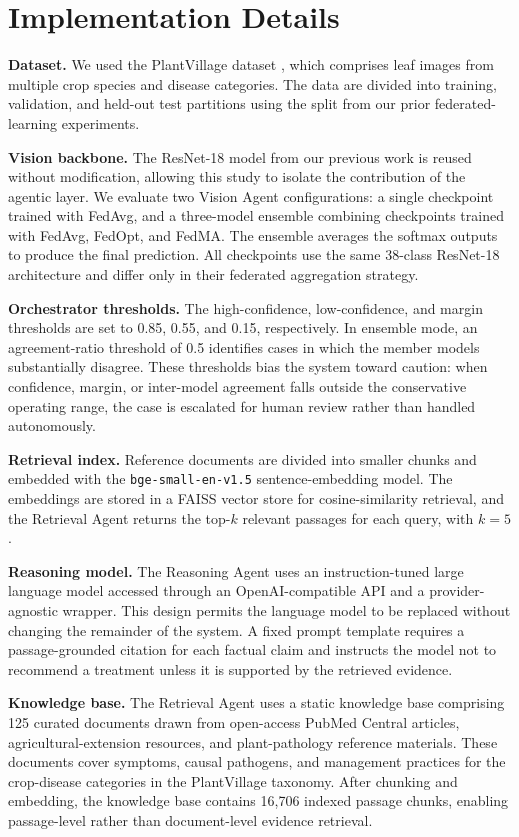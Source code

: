 \documentclass[conference]{IEEEtran}
\begin{document}
\section{Implementation Details}
\label{sec:impl}

\textbf{Dataset.} We used the PlantVillage dataset \cite{r_hughes2015}, which comprises leaf images from multiple crop species and disease categories. The data are divided into training, validation, and held-out test partitions using the split from our prior federated-learning experiments.

\textbf{Vision backbone.} The ResNet-18 model \cite{r_he2016} from our previous work is reused without modification, allowing this study to isolate the contribution of the agentic layer. We evaluate two Vision Agent configurations: a single checkpoint trained with FedAvg, and a three-model ensemble combining checkpoints trained with FedAvg, FedOpt, and FedMA. The ensemble averages the softmax outputs to produce the final prediction. All checkpoints use the same 38-class ResNet-18 architecture and differ only in their federated aggregation strategy.

\textbf{Orchestrator thresholds.} The high-confidence, low-confidence, and margin thresholds are set to 0.85, 0.55, and 0.15, respectively. In ensemble mode, an agreement-ratio threshold of 0.5 identifies cases in which the member models substantially disagree. These thresholds bias the system toward caution: when confidence, margin, or inter-model agreement falls outside the conservative operating range, the case is escalated for human review rather than handled autonomously.

\textbf{Retrieval index.} Reference documents are divided into smaller chunks and embedded with the \texttt{bge-small-en-v1.5} sentence-embedding model. The embeddings are stored in a FAISS vector store \cite{r_faiss} for cosine-similarity retrieval, and the Retrieval Agent returns the top-$k$ relevant passages for each query, with $k=5$.

\textbf{Reasoning model.} The Reasoning Agent uses an instruction-tuned large language model accessed through an OpenAI-compatible API and a provider-agnostic wrapper. This design permits the language model to be replaced without changing the remainder of the system. A fixed prompt template requires a passage-grounded citation for each factual claim and instructs the model not to recommend a treatment unless it is supported by the retrieved evidence.

\textbf{Knowledge base.} The Retrieval Agent uses a static knowledge base comprising 125 curated documents drawn from open-access PubMed Central articles, agricultural-extension resources, and plant-pathology reference materials. These documents cover symptoms, causal pathogens, and management practices for the crop-disease categories in the PlantVillage taxonomy. After chunking and embedding, the knowledge base contains 16{,}706 indexed passage chunks, enabling passage-level rather than document-level evidence retrieval.
\end{document}

